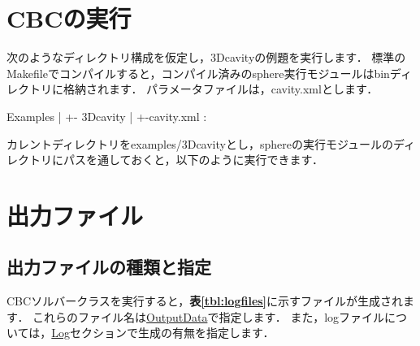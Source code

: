 \graphicspath{{./fig_Exec/}}
%

\section{CBCの実行}

次のようなディレクトリ構成を仮定し，3Dcavityの例題を実行します．
標準のMakefileでコンパイルすると，コンパイル済みのsphere実行モジュールはbinディレクトリに格納されます．
パラメータファイルは，cavity.xmlとします．

{\small
\begin{program}
Examples
  |
  +- 3Dcavity
  |    +-cavity.xml
  :
\end{program}
}

カレントディレクトリをexamples/3Dcavityとし，sphereの実行モジュールのディレクトリにパスを通しておくと，以下のように実行できます．

{\small
{}
}

%
\pagebreak
\section{出力ファイル}

\subsection{出力ファイルの種類と指定}
\label{sec:log_files}

CBCソルバークラスを実行すると，\textbf{表\ref{tbl:logfiles}}に示すファイルが生成されます．
これらのファイル名は\hyperlink{tgt:output_data}{OutputData}で指定します．
また，logファイルについては，\hyperlink{tgt:log}{Log}セクションで生成の有無を指定します．

